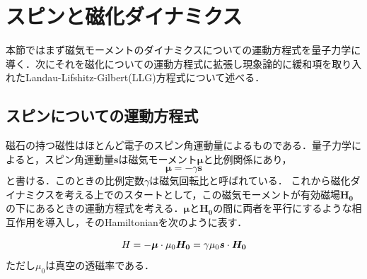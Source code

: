 

\section{スピンと磁化ダイナミクス}
本節ではまず磁気モーメントのダイナミクスについての運動方程式を量子力学に導く．次にそれを磁化についての運動方程式に拡張し現象論的に緩和項を取り入れたLandau-Lifshitz-Gilbert(LLG)方程式について述べる．
\subsection{スピンについての運動方程式}
磁石の持つ磁性はほとんど電子のスピン角運動量によるものである．量子力学によると，スピン角運動量$\bm{s}$は磁気モーメント$\bm{\mu}$と比例関係にあり，
\begin{equation}
\bm{\mu} = -\gamma\bm{s}
\label{eq:mudef}
\end{equation}
と書ける．このときの比例定数$\gamma$は磁気回転比と呼ばれている．
これから磁化ダイナミクスを考える上でのスタートとして，この磁気モーメントが有効磁場$\bm{H_{0}}$の下にあるときの運動方程式を考える．$\bm{\mu}$と$\bm{H_{0}}$の間に両者を平行にするような相互作用を導入し，そのHamiltonianを次のように表す．

\begin{equation}
\sl{H} = -\bm{\mu}\cdot\mu_{0}\bm{H_{0}} = \gamma\mu_{0}\bm{s}\cdot\bm{H_{0}}
\label{eq:hamil1}
\end{equation}
ただし$\mu_{0}$は真空の透磁率である．


